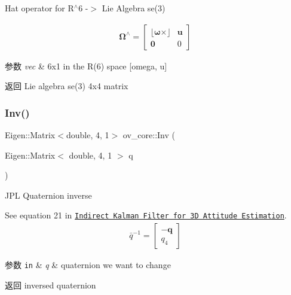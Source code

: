 Hat operator for R$^\wedge$6 -\/$>$ Lie Algebra se(3) 

\begin{align*} \boldsymbol\Omega^{\wedge} = \begin{bmatrix} \lfloor \boldsymbol\omega \times\rfloor & \mathbf u \\ \mathbf 0 & 0 \end{bmatrix} \end{align*}


\begin{DoxyParams}{参数}
{\em vec} & 6x1 in the R(6) space \mbox{[}omega, u\mbox{]} \\
\hline
\end{DoxyParams}
\begin{DoxyReturn}{返回}
Lie algebra se(3) 4x4 matrix 
\end{DoxyReturn}
\mbox{\label{namespaceov__core_a3ebbc28aa8b0945da800771168f7c843}} 
\subsubsection{\texorpdfstring{Inv()}{Inv()}}
{\footnotesize\ttfamily Eigen\+::\+Matrix$<$double, 4, 1$>$ ov\+\_\+core\+::\+Inv (\begin{DoxyParamCaption}\item[{Eigen\+::\+Matrix$<$ double, 4, 1 $>$}]{q }\end{DoxyParamCaption})\hspace{0.3cm}{\ttfamily [inline]}}



J\+PL Quaternion inverse 

See equation 21 in \href{http://mars.cs.umn.edu/tr/reports/Trawny05b.pdf}{\tt Indirect Kalman Filter for 3D Attitude Estimation}. \begin{align*} \bar{q}^{-1} = \begin{bmatrix} -\mathbf{q} \\ q_4 \end{bmatrix} \end{align*}


\begin{DoxyParams}[1]{参数}
\mbox{\tt in}  & {\em q} & quaternion we want to change \\
\hline
\end{DoxyParams}
\begin{DoxyReturn}{返回}
inversed quaternion 
\end{DoxyReturn}
\mbox{\label{namespaceov__core_aba0a3888c4f1998478719dc70597ac73}} 

